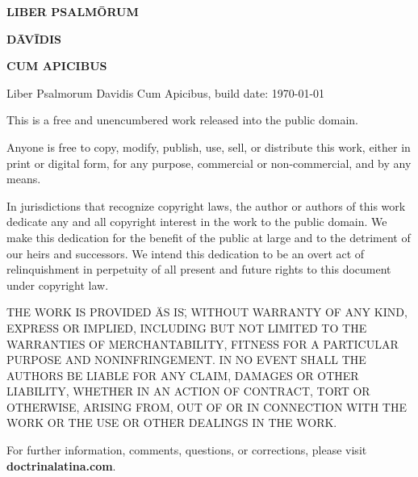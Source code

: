 \documentclass[10pt,openany]{book}
\begin{document}
\thispagestyle{empty} 
\begin{center}
\vspace*{\fill}
{\huge\bfseries{} LIBER PSALMŌRUM}
\vspace{2ex}

{\huge\bfseries{} DĀVĪDIS}
\vspace{6ex}

{\large\bfseries{} CUM APICIBUS}
\vspace{8ex}

\vspace*{\fill}
\end{center}
\newpage

\thispagestyle{empty} 
\begin{flushleft}
\vspace{8ex}
\begin{footnotesize}
\noindent
Liber Psalmorum Davidis Cum Apicibus, build date: \today

\noindent
This is a free and unencumbered work released into the public domain.

\noindent
Anyone is free to copy, modify, publish, use, sell, or distribute this work, either in print or digital form, for any purpose, commercial or non-commercial, and by any means.

\noindent
In jurisdictions that recognize copyright laws, the author or authors of this work dedicate any and all copyright interest in the work to the public domain. We make this dedication for the benefit of the public at large and to the detriment of our heirs and successors. We intend this dedication to be an overt act of relinquishment in perpetuity of all present and future rights to this document under copyright law.

\noindent
THE WORK IS PROVIDED \"AS IS\", WITHOUT WARRANTY OF ANY KIND, EXPRESS OR IMPLIED, INCLUDING BUT NOT LIMITED TO THE WARRANTIES OF MERCHANTABILITY, FITNESS FOR A PARTICULAR PURPOSE AND NONINFRINGEMENT. IN NO EVENT SHALL THE AUTHORS BE LIABLE FOR ANY CLAIM, DAMAGES OR OTHER LIABILITY, WHETHER IN AN ACTION OF CONTRACT, TORT OR OTHERWISE, ARISING FROM, OUT OF OR IN CONNECTION WITH THE WORK OR THE USE OR OTHER DEALINGS IN THE WORK.
\vspace{4ex}

\noindent
For further information, comments, questions, or corrections, please visit \textbf{doctrinalatina.com}.

\end{footnotesize}
\vspace*{\fill}
\end{flushleft}
\newpage
\end{document}
